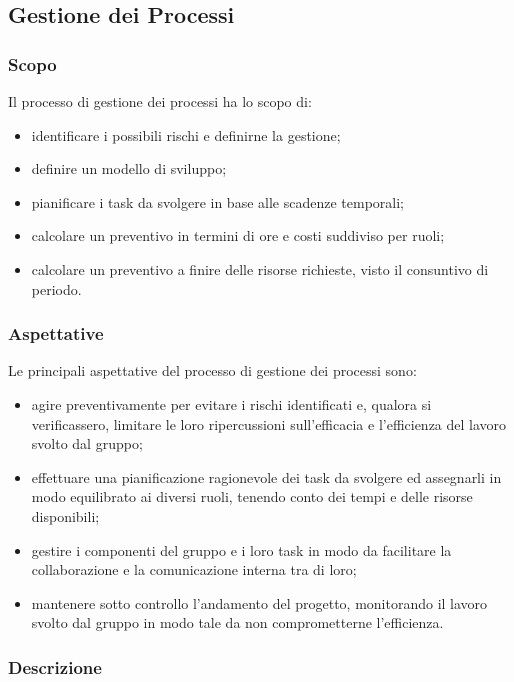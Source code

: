 \subsection{Gestione dei Processi}

	\subsubsection{Scopo}
	
		Il processo di gestione dei processi ha lo scopo di:
		
		\begin{itemize}
			\item identificare i possibili rischi e definirne la gestione;
			\item definire un modello di sviluppo;
			\item pianificare i task da svolgere in base alle scadenze temporali;
			\item calcolare un preventivo in termini di ore e costi suddiviso per ruoli; 
			\item calcolare un preventivo a finire delle risorse richieste, visto il consuntivo di periodo.
		\end{itemize}
		
	\subsubsection{Aspettative}
		
		Le principali aspettative del processo di gestione dei processi sono:
	
		\begin{itemize}
			\item agire preventivamente per evitare i rischi identificati e, qualora si verificassero, limitare le loro ripercussioni sull'efficacia e l'efficienza del lavoro svolto dal gruppo;
			\item effettuare una pianificazione ragionevole dei task da svolgere ed assegnarli in modo equilibrato ai diversi ruoli, tenendo conto dei tempi e delle risorse disponibili;
			\item gestire i componenti del gruppo e i loro task in modo da facilitare la collaborazione e la comunicazione interna tra di loro;
			\item mantenere sotto controllo l'andamento del progetto, monitorando il lavoro svolto dal gruppo in modo tale da non comprometterne l'efficienza.
		\end{itemize}
	
	\subsubsection{Descrizione}
	
